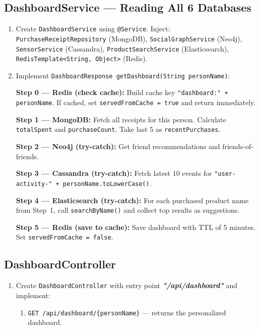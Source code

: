 \documentclass[a4paper]{article}
\begin{document}
\subsection*{DashboardService --- Reading All 6 Databases}
\begin{enumerate}
  \item Create \texttt{DashboardService} using \texttt{@Service}. Inject: \texttt{PurchaseReceiptRepository} (MongoDB), \texttt{SocialGraphService} (Neo4j), \texttt{SensorService} (Cassandra), \texttt{ProductSearchService} (Elasticsearch), \texttt{RedisTemplate<String, Object>} (Redis).
  \item Implement \texttt{DashboardResponse getDashboard(String personName)}:

    \textbf{Step 0 --- Redis (check cache):} Build cache key \texttt{"dashboard:" + personName}. If cached, set \texttt{servedFromCache = true} and return immediately.

    \textbf{Step 1 --- MongoDB:} Fetch all receipts for this person. Calculate \texttt{totalSpent} and \texttt{purchaseCount}. Take last 5 as \texttt{recentPurchases}.

    \textbf{Step 2 --- Neo4j (try-catch):} Get friend recommendations and friends-of-friends.

    \textbf{Step 3 --- Cassandra (try-catch):} Fetch latest 10 events for \texttt{"user-activity-" + personName.toLowerCase()}.

    \textbf{Step 4 --- Elasticsearch (try-catch):} For each purchased product name from Step~1, call \texttt{searchByName()} and collect top results as suggestions.

    \textbf{Step 5 --- Redis (save to cache):} Save dashboard with TTL of 5 minutes. Set \texttt{servedFromCache = false}.
\end{enumerate}

\subsection*{DashboardController}
\begin{enumerate}
  \item Create \texttt{DashboardController} with entry point \textit{\textbf{"/api/dashboard"}} and implement:
    \begin{enumerate}
      \item \texttt{GET /api/dashboard/\{personName\}} --- returns the personalized dashboard.
    \end{enumerate}
\end{enumerate}
\end{document}
